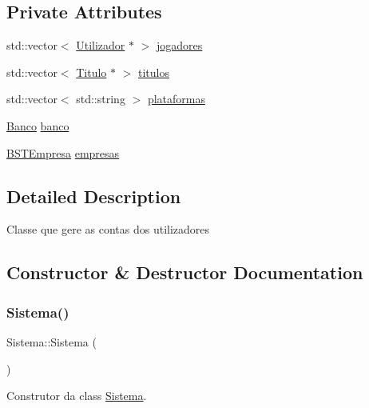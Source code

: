 \subsection*{Private Attributes}
\begin{DoxyCompactItemize}
\item 
std\+::vector$<$ \mbox{\hyperlink{class_utilizador}{Utilizador}} $\ast$ $>$ \mbox{\hyperlink{class_sistema_a940c20d39559da85af211390fd952726}{jogadores}}
\item 
std\+::vector$<$ \mbox{\hyperlink{class_titulo}{Titulo}} $\ast$ $>$ \mbox{\hyperlink{class_sistema_a1b412fc420c5592ed2eb111606b7b9d8}{titulos}}
\item 
std\+::vector$<$ std\+::string $>$ \mbox{\hyperlink{class_sistema_ab467836c1a7e4291614f93cafb25e9f2}{plataformas}}
\item 
\mbox{\hyperlink{class_banco}{Banco}} \mbox{\hyperlink{class_sistema_a45987b36e4f9ce47109c1c264fcc0b78}{banco}}
\item 
\mbox{\hyperlink{_sistema_8h_a01003fd698337e71bc8e8addc8121117}{B\+S\+T\+Empresa}} \mbox{\hyperlink{class_sistema_a579aab792a23d8af98b39b7e5863fc26}{empresas}}
\end{DoxyCompactItemize}


\subsection{Detailed Description}
Classe que gere as contas dos utilizadores 

\subsection{Constructor \& Destructor Documentation}
\mbox{\label{class_sistema_a815b07845ef6b03247b239333fe75e28}} 
\subsubsection{\texorpdfstring{Sistema()}{Sistema()}}
{\footnotesize\ttfamily Sistema\+::\+Sistema (\begin{DoxyParamCaption}{ }\end{DoxyParamCaption})\hspace{0.3cm}{\ttfamily [inline]}}



Construtor da class \mbox{\hyperlink{class_sistema}{Sistema}}. 


